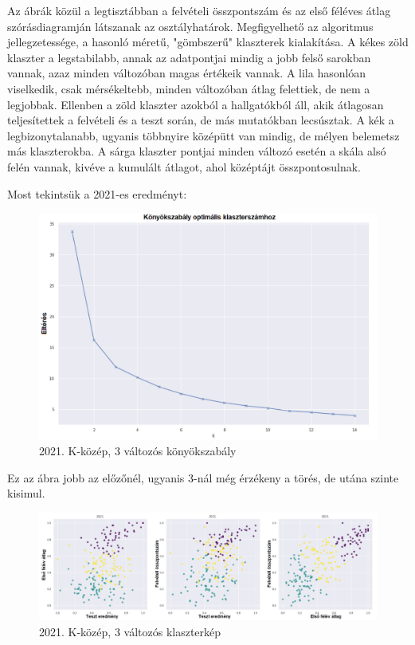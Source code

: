 \documentclass[12pt]{article}
\begin{document}
Az ábrák közül a legtisztábban a felvételi összpontszám és az első féléves átlag szórásdiagramján látszanak az osztályhatárok. Megfigyelhető az algoritmus jellegzetessége, a hasonló méretű, "gömbszerű" klaszterek kialakítása. A kékes zöld klaszter a legstabilabb, annak az adatpontjai mindig a jobb felső sarokban vannak, azaz minden változóban magas értékeik vannak. A lila hasonlóan viselkedik, csak mérsékeltebb, minden változóban átlag felettiek, de nem a legjobbak. Ellenben a zöld klaszter azokból a hallgatókból áll, akik átlagosan teljesítettek a felvételi és a teszt során, de más mutatókban lecsúsztak. A kék a legbizonytalanabb, ugyanis többnyire középütt van mindig, de mélyen belemetsz más klaszterokba. A sárga klaszter pontjai minden változó esetén a skála alsó felén vannak, kivéve a kumulált átlagot, ahol középtájt összpontosulnak.

Most tekintsük a 2021-es eredményt:

\begin{figure}[H]
\centering
\includegraphics[scale = 0.6]{kepek/2021_kmeans_konyok.png}
\caption{2021. K-közép, 3 változós könyökszabály}
\label{fig:2021_kmeans_konyok}
\end{figure}

Ez az ábra jobb az előzőnél, ugyanis 3-nál még érzékeny a törés, de utána szinte kisimul.

\begin{figure}[H]
\centering
\includegraphics[width = \textwidth]{kepek/2021klacter.png}
\caption{2021. K-közép, 3 változós klaszterkép}
\label{fig:2021klacter}
\end{figure}
\end{document}
